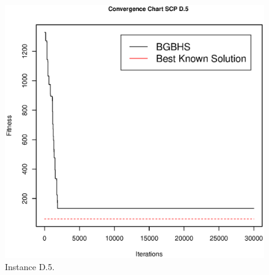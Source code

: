 \begin{figure}[]
\centering
\includegraphics[scale=.45]{Resultados/scpD5.eps}
\caption{Instance D.5.}
\label{fig:Instance.D.5}
\end{figure}

